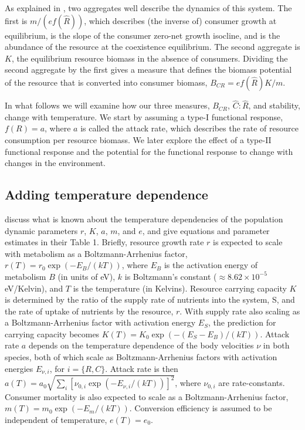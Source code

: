 \documentclass[11pt]{article}
\begin{document}
As explained in \cite{Gilbert2014}, two aggregates well describe the dynamics of this system.
The first is $m /(e f(\hat{R}))$, which describes (the inverse of) consumer growth at equilibrium, is the slope of the consumer zero-net growth isocline, and is the abundance of the resource at the coexistence equilibrium.
The second aggregate is $K$, the equilibrium resource biomass in the absence of consumers.
Dividing the second aggregate by the first gives a measure that defines the biomass potential of the resource that is converted into consumer biomass, $B_{CR} = e f(\hat{R}) K / m$.

In what follows we will examine how our three measures, $B_{CR}$, $\hat{C}:\hat{R}$, and stability, change with temperature.
We start by assuming a type-I functional response, $f(R) = a$, where $a$ is called the attack rate, which describes the rate of resource consumption per resource biomass.
We later explore the effect of a type-II functional response and the potential for the functional response to change with changes in the environment.

\subsection*{Adding temperature dependence}

\cite{Gilbert2014} discuss what is known about the temperature dependencies of the population dynamic parameters $r$, $K$, $a$, $m$, and $e$, and give equations and parameter estimates in their Table 1.
Briefly, resource growth rate $r$ is expected to scale with metabolism as a Boltzmann-Arrhenius factor, $r(T) = r_0 \exp(-E_B/(kT))$, where $E_B$ is the activation energy of metabolism $B$ (in units of eV), $k$ is Boltzmann's constant ($\approx 8.62 \times 10^{-5}$ eV/Kelvin), and $T$ is the temperature (in Kelvins).
Resource carrying capacity $K$ is determined by the ratio of the supply rate of nutrients into the system, S, and the rate of uptake of nutrients by the resource, $r$.
With supply rate also scaling as a Boltzmann-Arrhenius factor with activation energy $E_S$, the prediction for carrying capacity becomes  $K(T) = K_0 \exp(-(E_S - E_B)/(kT))$. 
Attack rate $a$ depends on the temperature dependence of the body velocities $\nu$ in both species, both of which scale as Boltzmann-Arrhenius factors with activation energies $E_{\nu,i}$, for $i=\{R,C\}$.
Attack rate is then $a(T) = a_0 \sqrt{\sum_i \left[\nu_{0,i} \exp(-E_{\nu,i}/(kT)) \right]^2}$, where $\nu_{0,i}$ are rate-constants.
Consumer mortality is also expected to scale as a Boltzmann-Arrhenius factor, $m(T) = m_0 \exp(-E_m/(kT))$.
Conversion efficiency is assumed to be independent of temperature, $e(T) = e_0$.
\end{document}
